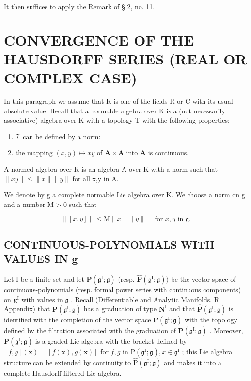 It then suffices to apply the Remark of § 2, no. 11.

\section{CONVERGENCE OF THE HAUSDORFF SERIES (REAL OR COMPLEX CASE)}

In this paragraph we assume that K is one of the fields R or C with its usual absolute value. Recall that a normable algebra over K is a (not necessarily associative) algebra over K with a topology T with the following properties:

\begin{enumerate}
\def\labelenumi{(\arabic{enumi})}
\item
  \(\mathcal{T}\) can be defined by a norm:
\item
  the mapping \((x,y)\mapsto xy\) of \(\mathbf{A}\times \mathbf{A}\) into \(\mathbf{A}\) is continuous.
\end{enumerate}

A normed algebra over K is an algebra A over K with a norm such that \(\|xy\|\leqslant\|x\|\|y\|\) for all x,y in A.

We denote by g a complete normable Lie algebra over K. We choose a norm on g and a number M > 0 such that

\[
\| [ x, y ] \| \leqslant \mathrm{M} \| x \| \| y \| \quad \text { for } x, y \text { in } \mathfrak {g}.\tag{1}
\]

\subsection{CONTINUOUS-POLYNOMIALS WITH VALUES IN g}

Let I be a finite set and let \(\mathbf{P}(\mathfrak{g}^{\mathrm{I}};\mathfrak{g})\) (resp. \(\hat{\mathbf{P}} (\mathfrak{g}^{\mathrm{I}};\mathfrak{g}))\) be the vector space of continuous-polynomials (resp. formal power series with continuous components) on \(\mathbf{g}^{\mathrm{I}}\) with values in \(\mathfrak{g}\) . Recall (Differentiable and Analytic Manifolds, R, Appendix) that \(\mathbf{P}(\mathfrak{g}^{\mathrm{I}};\mathfrak{g})\) has a graduation of type \(\mathbf{N}^{\mathrm{I}}\) and that \(\hat{\mathbf{P}} (\mathfrak{g}^{\mathrm{I}};\mathfrak{g})\) is identified with the completion of the vector space \(\mathbf{P} (\mathfrak{g}^{\mathrm{I}};\mathfrak{g})\) with the topology defined by the filtration associated with the graduation of \(\mathbf{P}(\mathfrak{g}^{\mathrm{I}};\mathfrak{g})\) . Moreover, \(\mathbf{P}(\mathfrak{g}^{\mathrm{I}};\mathfrak{g})\) is a graded Lie algebra with the bracket defined by \([f,g](\pmb {x}) = [f(\pmb {x}),g(\pmb {x})]\) for \(f, g\) in \(\mathrm{P}(\mathfrak{g}^{\mathrm{I}}; \mathfrak{g}), x \in \mathfrak{g}^{\mathrm{I}}\) ; this Lie algebra structure can be extended by continuity to \(\hat{\mathrm{P}}(\mathfrak{g}^{\mathrm{I}}; \mathfrak{g})\) and makes it into a complete Hausdorff filtered Lie algebra.

